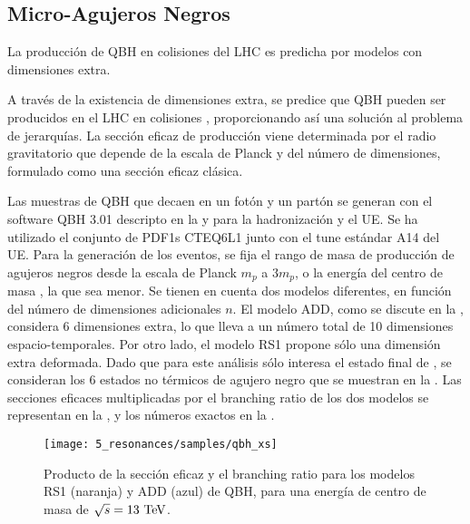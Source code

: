 \subsection{Micro-Agujeros Negros}
\label{subsec:samples:samples:sig:qbh}

La producci\'on de \ac{QBH} en colisiones \pp del \ac{LHC} es predicha por modelos con dimensiones extra.

A trav\'es de la existencia de dimensiones extra, se predice que \acf{QBH} pueden ser producidos en el \ac{LHC} en colisiones \pp, proporcionando as\'i una solución al problema de jerarquías.
La sección eficaz de producción viene determinada por el radio gravitatorio que depende de la escala de Planck y del número de dimensiones, formulado como una sección eficaz clásica.


Las muestras de \ac{QBH} que decaen en un fotón y un partón se generan con el software \ac{QBH} 3.01 descripto en la  y  para la hadronización y el \ac{UE}. Se ha utilizado el conjunto de \acp{PDF1} CTEQ6L1 junto con el tune estándar A14 del \ac{UE}.  Para la generaci\'on de los eventos, se fija el rango de masa de producción de agujeros negros desde la escala de Planck \(m_p\) a \(3 m_p\), o la energía del centro de masa \sqs, la que sea menor. Se tienen en cuenta dos modelos diferentes, en función del número de dimensiones adicionales \(n\). El modelo ADD, como se discute en la \Sect{\ref{subsec:theory:bsm:qbh}}, considera 6 dimensiones extra, lo que lleva a un número total de 10 dimensiones espacio-temporales. Por otro lado, el modelo RS1 propone sólo una dimensión extra deformada. Dado que para este análisis sólo interesa el estado final de \gammajet, se consideran los 6 estados no térmicos de agujero negro que se muestran en la \Sect{\ref{subsec:theory:bsm:qbh}}. Las secciones eficaces multiplicadas por el branching ratio de los dos modelos se representan en la \Fig{\ref{fig:samples:samples:sig:qbh:xs}}, y los números exactos en la \Tab{\ref{tab:samples:samples:sig:qbh:xs}}.


\begin{figure}[ht!]
    \centering
    \texttt{[image: 5\_resonances/samples/qbh\_xs]}
    \caption{Producto de la secci\'on eficaz y el branching ratio para los modelos RS1 (naranja) y ADD (azul) de \ac{QBH}, para una energ\'ia de centro de masa de \(\sqrt{s}=13~\text{TeV}\).}
    \label{fig:samples:samples:sig:qbh:xs}
\end{figure}


